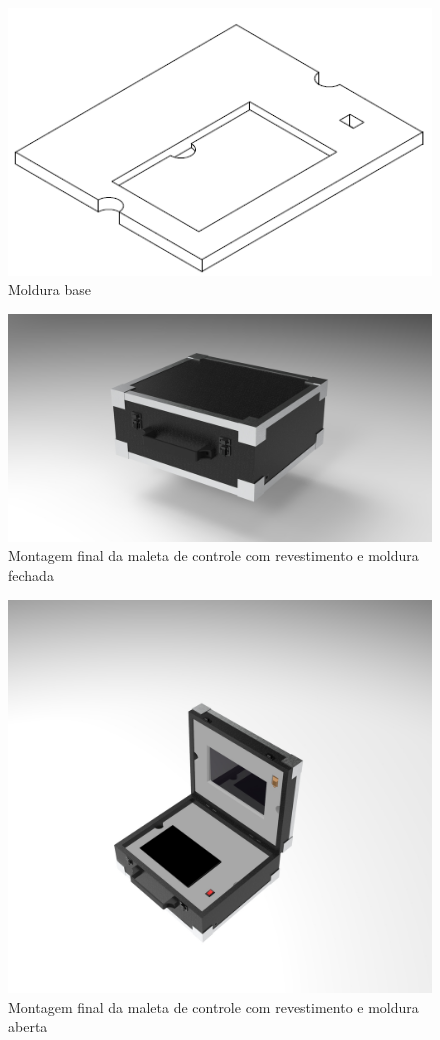\begin{figure}[H]
    \centering
    \includegraphics[width=.7\textwidth]{Figuras/gcs/moldurabase.png}
    \caption{Moldura base}
    \label{fig:moldurabase}
\end{figure}


\begin{figure}[H]
    \centering
    \includegraphics[width=.7\textwidth]{Figuras/gcs/untitled.17.jpg}
    \caption{Montagem final da maleta de controle com revestimento e moldura fechada}
    \label{fig:maletacontrolefinalfechada}
\end{figure}

\begin{figure}[H]
    \centering
    \includegraphics[width=.7\textwidth]{Figuras/gcs/untitled.18.jpg}
    \caption{Montagem final da maleta de controle com revestimento e moldura aberta}
    \label{fig:maletacontrolefinalaberta}
\end{figure}

